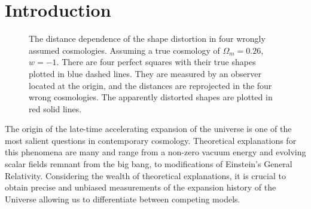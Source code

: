 \documentclass[iop]{emulateapj}
\begin{document}

\section{Introduction}

\begin{figure}
   \caption{\label{fig_xy}
   The distance dependence of the shape distortion in four wrongly assumed cosmologies.
   Assuming a true cosmology of $\Omega_m=0.26$, $w=-1$.
   There are four perfect squares with their true shapes plotted in blue dashed lines.
   They are measured by an observer located at the origin, and the distances are reprojected in the four wrong cosmologies.
   The apparently distorted shapes are plotted in red solid lines.
   }
\end{figure}

The  origin  of  the late-time accelerating  expansion  of  the  universe  is  one of  the  most  salient  questions  in  contemporary cosmology. 
Theoretical explanations for this phenomena are many and range from a non-zero  vacuum energy and evolving  scalar  fields  remnant  from  the  big  bang, 
to modifications of Einstein's General Relativity\cite{2012IJMPD..2130002Y}. 
Considering the wealth of theoretical explanations, 
it is crucial to obtain precise and unbiased measurements of the expansion history of the Universe allowing us to 
differentiate between competing models. 
\end{document}
